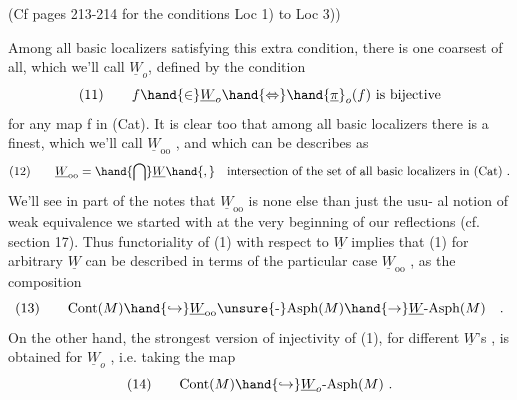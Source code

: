 
(Cf pages 213-214  for the conditions Loc 1)  to  Loc 3))

Among all basic localizers satisfying this extra condition,  there
is one coarsest of all,  which we'll call $\underline{W}_{o}$, defined by the condition
\[ (11) \qquad f \hand{\in} \underline{W}_{o} \hand{\Leftrightarrow} \hand{\underline{\pi}}_{o}(f) \text{ is bijective} \]
for any map f in (Cat).  It is clear too that among all basic localizers
there is a finest,  which we'll call $\underline{W}_{\mathrm{oo}}$ ,  and which can be describes as
\[ (12) \qquad \underline{W}_{\mathrm{oo}} = \hand{\bigcap} \underline{W} \hand{,} \quad \text{intersection of the set of all basic localizers in (Cat) .} \]
We'll see in part  of the notes that $\underline{W}_{\mathrm{oo}}$ is none else than just the usu-%
al notion of weak equivalence\deleted{,}  we started with\hand{,} at the very beginning of
our reflections  (cf. section 17).  Thus functoriality of (1) with respect
to $\underline{W}$ implies that (1)  for arbitrary $\underline{W}$ can be described in terms of the
particular case $\underline{W}_{\mathrm{oo}}$ ,  as the composition
\[ (13) \qquad \mathrm{Cont}(M) \hand{\hookrightarrow} \underline{W}_{\mathrm{oo}}\text{\unsure{-}Asph}(M) \hand{\rightarrow} \underline{W}\text{-Asph}(M) \quad . \]
On the other hand,  the strongest version of injectivity of (1),  for
different $\underline{W}$'s ,  is obtained for $\underline{W}_{o}$ ,  i.e.  taking the map
\[ (14) \qquad \mathrm{Cont}(M) \hand{\hookrightarrow} \underline{W}_{o}\text{-Asph}(M) \ . \]

